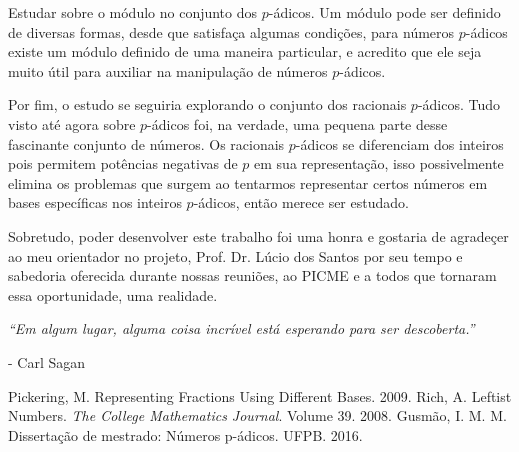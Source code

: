 \documentclass{report}
\theoremstyle{definition}
\begin{document}
Estudar sobre o módulo no conjunto dos $p$-ádicos. Um módulo pode ser definido de diversas formas, desde que satisfaça algumas condições, para números $p$-ádicos existe um módulo definido de uma maneira particular, e acredito que ele seja muito útil para auxiliar na manipulação de números $p$-ádicos.

Por fim, o estudo se seguiria explorando o conjunto dos racionais $p$-ádicos. Tudo visto até agora sobre $p$-ádicos foi, na verdade, uma pequena parte desse fascinante conjunto de números. Os racionais $p$-ádicos se diferenciam dos inteiros pois permitem potências negativas de $p$ em sua representação, isso possivelmente elimina os problemas que surgem ao tentarmos representar certos números em bases específicas nos inteiros $p$-ádicos, então merece ser estudado.

Sobretudo, poder desenvolver este trabalho foi uma honra e gostaria de agradeçer ao meu orientador no projeto, Prof. Dr. Lúcio dos Santos por seu tempo e sabedoria oferecida durante nossas reuniões, ao PICME e a todos que tornaram essa oportunidade, uma realidade. 

\vfill

\emph{``Em algum lugar, alguma coisa incrível está esperando para ser descoberta.''}

{\raggedleft - Carl Sagan\quad\par} 



\nocite{*}
\begin{thebibliography}{3}
\bibitem{} Pickering, M. Representing Fractions Using Different Bases. 2009.
\bibitem{} Rich, A. Leftist Numbers. \textit{The College Mathematics Journal}. Volume 39. 2008.
\bibitem{} Gusmão, I. M. M. Dissertação de mestrado: Números p-ádicos. UFPB. 2016. 
\end{thebibliography}


\end{document}
